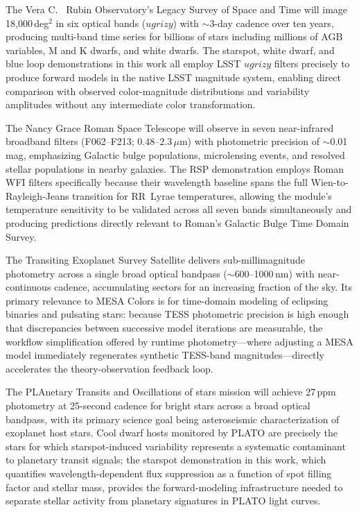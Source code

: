 \documentclass[linenumbers,apj,twocolumn, floatfix]{aastex701}
\begin{document}
The Vera C.
\ Rubin Observatory's Legacy Survey of Space and Time \citep{LSST}
will image 18{,}000\,deg$^2$ in six optical bands ($ugrizy$) with $\sim$3-day cadence over ten years, producing multi-band time series for billions of stars including millions of AGB variables, M and K dwarfs, and white dwarfs.
The starspot, white dwarf, and blue loop demonstrations in this work all employ LSST $ugrizy$ filters precisely to produce forward models in the native LSST magnitude system, enabling direct comparison with observed color-magnitude distributions and variability amplitudes without any intermediate color transformation.

The Nancy Grace Roman Space Telescope \citep{roman} will observe in seven near-infrared broadband filters (F062--F213; $0.48$--$2.3\,\mu$m) with photometric precision of $\sim$0.01\,mag, emphasizing Galactic bulge populations, microlensing events, and resolved stellar populations in nearby galaxies.
The RSP demonstration employs Roman WFI filters specifically because their wavelength baseline spans the full Wien-to-Rayleigh-Jeans transition for RR~Lyrae temperatures, allowing the module's temperature sensitivity to be validated across all seven bands simultaneously and producing predictions directly relevant to Roman's Galactic Bulge Time Domain Survey.

The Transiting Exoplanet Survey Satellite \citep[TESS;][]{tess} delivers sub-millimagnitude photometry across a single broad optical bandpass ($\sim$600--1000\,nm) with near-continuous cadence, accumulating sectors for an increasing fraction of the sky.
Its primary relevance to MESA Colors is for time-domain modeling of eclipsing binaries and pulsating stars: because TESS photometric precision is high enough that discrepancies between successive model iterations are measurable, the workflow simplification offered by runtime photometry---where adjusting a MESA model immediately regenerates synthetic TESS-band magnitudes---directly accelerates the theory-observation feedback loop.

The PLAnetary Transits and Oscillations of stars mission \citep{plato} will achieve 27\,ppm photometry at 25-second cadence for bright stars across a broad optical bandpass, with its primary science goal being asteroseismic characterization of exoplanet host stars.
Cool dwarf hosts monitored by PLATO are precisely the stars for which starspot-induced variability represents a systematic contaminant to planetary transit signals; the starspot demonstration in this work, which quantifies wavelength-dependent flux suppression as a function of spot filling factor and stellar mass, provides the forward-modeling infrastructure needed to separate stellar activity from planetary signatures in PLATO light curves.
\end{document}
